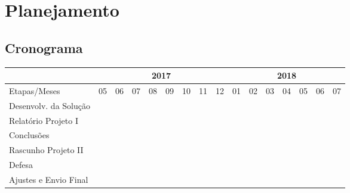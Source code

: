 \documentclass[
	12pt,				%
	openright,			%
	twoside,			%
	a4paper,			%
	english,			%
	brazil,				%
	]{abntex2}
\begin{document}



\chapter{Planejamento}

\section{Cronograma}

\newcommand{\cc}{\cellcolor{black!25}}  %

\begin{flushleft}
\begin{tabular}{|l|c|c|c|c|c|c|c|c|c|c|c|c|c|c|c|}
\hline
       & \multicolumn{8}{c|}{2017} & \multicolumn{7}{c|}{2018}\\ \hline
       
Etapas/Meses & 05 & 06 & 07 & 08 & 09 & 10 & 11 & 12 & 01 & 02 & 03 & 04 & 05 & 06 & 07 \\ \hline
Desenvolv. da Solução  & \cc & \cc & \cc & \cc & \cc & \cc & \cc & \cc & \cc & \cc & &  &  &  & \\ \hline
Relatório Projeto I  & & &  &  &  &  & \cc & &  &  &  &  &  &  & \\ \hline
Conclusões  & & &  &  &  &  &  &  &  & \cc & \cc & &  &  & \\ \hline
Rascunho Projeto II  & & &  &  &  &  &  &  &  &  &  & \cc & &  & \\ \hline
Defesa  & & &  &  &  &  &  &  &  &  &  &  & \cc & & \\ \hline
Ajustes e Envio Final  & & &  &  &  &  &  &  &  &  &  &  & \cc & \cc & \cc \\ \hline
\end{tabular}
\end{flushleft}
\end{document}
